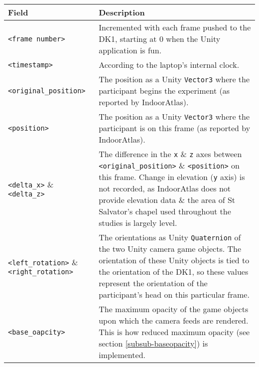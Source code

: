 \begin{center}
\begin{longtable}{| l | p{8cm} |}

\hline

\textbf{Field} & \textbf{Description} \\

\hline

\texttt{<frame number>} & Incremented with each frame pushed to the DK1, starting at 0 when the Unity application is fun. \\

\hline

\texttt{<timestamp>} & According to the laptop's internal clock. \\

\hline

\texttt{<original\_position>} & The position as a Unity \texttt{Vector3} where the participant begins the experiment (as reported by IndoorAtlas). \\

\hline

\texttt{<position>} & The position as a Unity \texttt{Vector3} where the participant is on this frame (as reported by IndoorAtlas). \\

\hline

\texttt{<delta\_x>} \& \texttt{<delta\_z>} & The difference in the \texttt{x} \& \texttt{z} axes between \texttt{<original\_position>} \& \texttt{<position>} on this frame. Change in elevation (\texttt{y} axis) is not recorded, as IndoorAtlas does not provide elevation data \& the area of St Salvator's chapel used throughout the studies is largely level. \\

\hline

\texttt{<left\_rotation>} \& \texttt{<right\_rotation>} & The orientations as Unity \texttt{Quaternion} of the two Unity camera game objects. The orientation of these Unity objects is tied to the orientation of the DK1, so these values represent the orientation of the participant's head on this particular frame. \\

\hline

\texttt{<base\_oapcity>} & The maximum opacity of the game objects upon which the camera feeds are rendered. This is how reduced maximum opacity (see section \ref{subsub-baseopacity}) is implemented. \\


\end{longtable}
\end{center}
